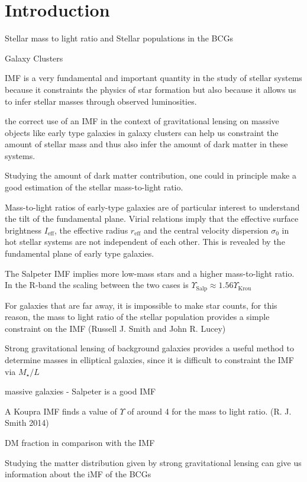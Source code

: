 \chapter{Introduction}

Stellar mass to light ratio and Stellar populations in the BCGs

Galaxy Clusters

IMF is a very fundamental and important quantity in the study of stellar systems because it constraints the physics of star formation but also because it allows us to infer stellar masses through observed luminosities.

the correct use of an IMF in the context of gravitational lensing on massive objects like early type galaxies in galaxy clusters can help us constraint the amount of stellar mass and thus also infer the amount of dark matter in these systems.

Studying the amount of dark matter contribution, one could in principle make a good estimation of the stellar mass-to-light ratio.

Mass-to-light ratios of early-type galaxies are of particular interest to understand the tilt of the fundamental plane. Virial relations imply that the effective surface brightness $I_{\text{eff}}$, the effective radius $r_{\text{eff}}$ and the central velocity dispersion $\sigma_{0}$ in hot stellar systems are not independent of each other. This is revealed by the fundamental plane of early type galaxies.

The Salpeter IMF implies more low-mass stars and a higher mass-to-light ratio. In the R-band the scaling between the two cases is $\Upsilon_{\text{Salp}}\approx 1.56\Upsilon_{\text{Krou}}$

For galaxies that are far away, it is impossible to make star counts, for this reason, the mass to light ratio of the stellar population provides a simple constraint on the IMF (Russell J. Smith and John R. Lucey) 

Strong gravitational lensing of background galaxies provides a useful method to determine masses in elliptical galaxies, since it is difficult to constraint the IMF via $M_{\star}/L$

massive galaxies - Salpeter is a good IMF

A Koupra IMF finds a value of $\Upsilon$ of around 4 for the mass to light ratio. (R. J. Smith 2014) 

DM fraction in comparison with the IMF 

Studying the matter distribution given by strong gravitational lensing can give us information about the iMF of the BCGs

